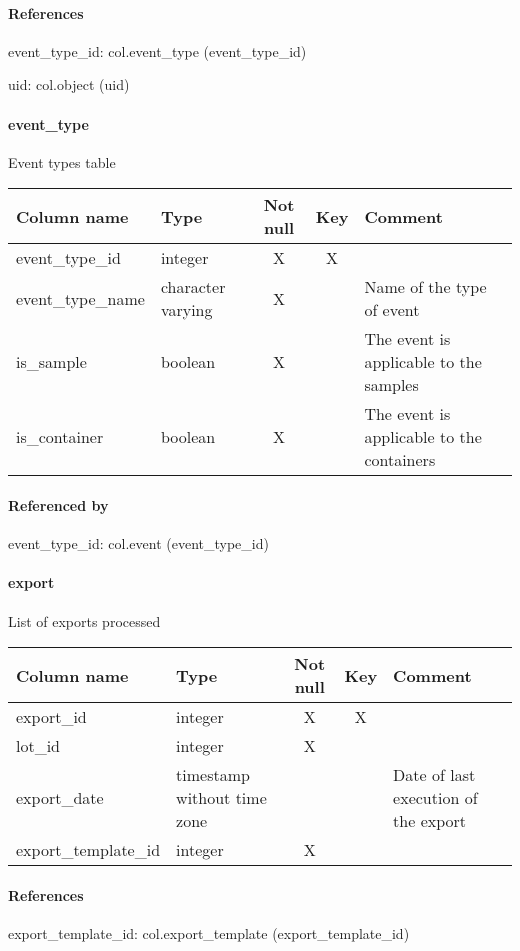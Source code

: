 \paragraph{References}
event\_type\_id: col.event\_type (event\_type\_id)

uid: col.object (uid)

\paragraph{event\_type}
Event types table

\begin{tabular}{|l| p{2cm}|c|c| p{5cm}|}
\hline
Column name & Type & Not null & Key & Comment \\
\hline
event\_type\_id & integer & X & X & \\
event\_type\_name & character varying & X &  & Name of the type of event\\
is\_sample & boolean & X &  & The event is applicable to the samples\\
is\_container & boolean & X &  & The event is applicable to the containers\\
\hline
\end{tabular}
\paragraph{Referenced by}
event\_type\_id: col.event (event\_type\_id)

\paragraph{export}
List of exports processed

\begin{tabular}{|l| p{2cm}|c|c| p{5cm}|}
\hline
Column name & Type & Not null & Key & Comment \\
\hline
export\_id & integer & X & X & \\
lot\_id & integer & X &  & \\
export\_date & timestamp without time zone &  &  & Date of last execution of the export\\
export\_template\_id & integer & X &  & \\
\hline
\end{tabular}
\paragraph{References}
export\_template\_id: col.export\_template (export\_template\_id)

